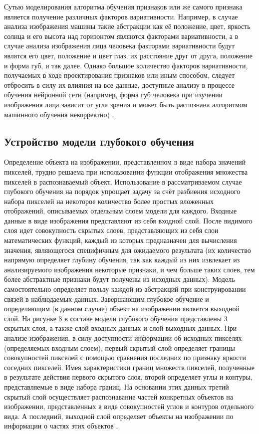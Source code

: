 \documentclass[bachelor, och, coursework]{SCWorks}
\begin{document}
        Сутью моделирования алгоритма обучения признаков или же самого признака является получение различных факторов вариативности. Например, в случае анализа изображения машины такие абстракции как её положение, цвет, яркость солнца и его высота над горизонтом являются факторами вариативности, а в случае анализа изображения лица человека факторами вариативности будут являтся его цвет, положение и цвет глаз, их расстояние друг от друга, положение и форма губ, и так далее. Однако большое количество факторов вариативности, получаемых в ходе проектирования признаков или иным способом, следует отбросить в силу их влияния на все данные, доступные анализу в процессе обучения нейронной сети (например, форма губ человека при изучении изображения лица зависит от угла зрения и может быть распознана алгоритмом машинного обучения некорректно) \cite{Gud2}.

    \subsection{Устройство модели глубокого обучения}

        Определение объекта на изображении, представленном в виде набора значений пикселей, трудно решаема при использовании функции отображения множества пикселей в распознаваемый объект. Использование в рассматриваемом случае глубокого обучения на порядок упрощает задачу за счёт разбиения исходного набора пикселей на некоторое количество более простых вложенных отображений, описываемых отдельным слоем модели для каждого. Входные данные в виде изображения представляют из себя входной слой. После видимого слоя идет совокупность скрытых слоев, представляющих из себя слои математических функций, каждый из которых предназначен для вычисления значения, являющегося специфичным для ожидаемого результата (их количество напрямую определяет глубину обучения, так как каждый из них извлекает из анализируемого изображения некоторые признаки, и чем больше таких слоев, тем более абстрактные признаки будут получены из исходных данных). Модель самостоятельно определяет пользу каждой из абстракций при конструировании связей в наблюдаемых данных. Завершающим глубокое обучение и определяющим (в данном случае) объект на изображении является выходной слой. На рисунке 8 в составе модели глубокого обучения представлены 3 скрытых слоя, а также слой входных данных и слой выходных данных. При анализе изображения, в силу доступности информации об исходных пикселях (определяемых входным слоем), первый скрытый слой определяет границы совокупностей пикселей с помощью сравнения последних по признаку яркости соседних пикселей. Имея характеристики границ множеств пикселей, полученные в результате действия первого скрытого слоя, второй определяет углы и контуры, представляемые в виде набора границ. На основании этих данных третий скрытый слой осуществляет распознавание частей конкретных объектов на изображении, представленных в виде совокупностей углов и контуров отдельного вида. А последний, выходной слой определяет объекты на изображении по информации о частях этих объектов \cite{Gud}.
\end{document}
